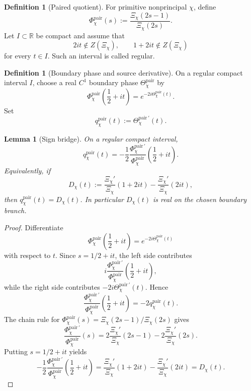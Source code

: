 \documentclass[11pt,a4paper]{amsart}
\theoremstyle{plain}
\newtheorem{lemma}[theorem]{Lemma}
\theoremstyle{definition}
\newtheorem{definition}[theorem]{Definition}
\newcommand{\pair}{\mathrm{pair}}
\newcommand{\R}{\mathbb R}
\begin{document}
\begin{definition}[Paired quotient]
For primitive nonprincipal \(\chi\), define
\[
  \Phi_\chi^{\pair}(s)
  :=
  \frac{\Xi_\chi(2s-1)}{\Xi_\chi(2s)}.
\]
Let \(I\subset \R\) be compact and assume that
\[
  2it\notin Z(\Xi_\chi),
  \qquad
  1+2it\notin Z(\Xi_\chi)
\]
for every \(t\in I\).  Such an interval is called regular.
\end{definition}

\begin{definition}[Boundary phase and source derivative]
\label{def:boundary-phase}
On a regular compact interval \(I\), choose a real \(C^1\) boundary phase
\(\Theta_\chi^{\pair}\) by
\[
  \Phi_\chi^{\pair}\!\left(\frac12+it\right)
  =
  e^{-2i\Theta_\chi^{\pair}(t)}.
\]
Set
\[
  q_\chi^{\pair}(t):=
  \Theta_\chi^{\pair\,\prime}(t).
\]
\end{definition}

\begin{lemma}[Sign bridge]
\label{lem:sign-bridge}
On a regular compact interval,
\[
  q_\chi^{\pair}(t)
  =
  -\frac12
  \frac{\Phi_\chi^{\pair\,\prime}}{\Phi_\chi^{\pair}}
  \!\left(\frac12+it\right).
\]
Equivalently, if
\[
  D_\chi(t):=
  \frac{\Xi_\chi'}{\Xi_\chi}(1+2it)
  -
  \frac{\Xi_\chi'}{\Xi_\chi}(2it),
\]
then \(q_\chi^{\pair}(t)=D_\chi(t)\).  In particular \(D_\chi(t)\) is real on
the chosen boundary branch.
\end{lemma}

\begin{proof}
Differentiate
\[
  \Phi_\chi^{\pair}\!\left(\frac12+it\right)
  =
  e^{-2i\Theta_\chi^{\pair}(t)}
\]
with respect to \(t\).  Since \(s=1/2+it\), the left side contributes
\[
  i\frac{\Phi_\chi^{\pair\,\prime}}{\Phi_\chi^{\pair}}
  \!\left(\frac12+it\right),
\]
while the right side contributes \(-2i\Theta_\chi^{\pair\,\prime}(t)\).  Hence
\[
  \frac{\Phi_\chi^{\pair\,\prime}}{\Phi_\chi^{\pair}}
  \!\left(\frac12+it\right)
  =
  -2q_\chi^{\pair}(t).
\]
The chain rule for
\(\Phi_\chi^{\pair}(s)=\Xi_\chi(2s-1)/\Xi_\chi(2s)\) gives
\[
  \frac{\Phi_\chi^{\pair\,\prime}}{\Phi_\chi^{\pair}}(s)
  =
  2\frac{\Xi_\chi'}{\Xi_\chi}(2s-1)
  -
  2\frac{\Xi_\chi'}{\Xi_\chi}(2s).
\]
Putting \(s=1/2+it\) yields
\[
  -\frac12
  \frac{\Phi_\chi^{\pair\,\prime}}{\Phi_\chi^{\pair}}
  \!\left(\frac12+it\right)
  =
  \frac{\Xi_\chi'}{\Xi_\chi}(1+2it)
  -
  \frac{\Xi_\chi'}{\Xi_\chi}(2it)
  =
  D_\chi(t).
\]
\end{proof}
\end{document}
